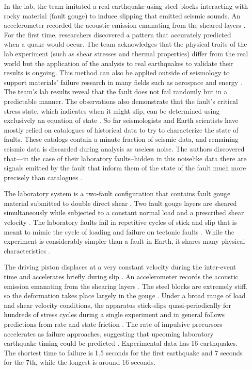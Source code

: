 \documentclass[]{llncs} %
\begin{document}
In the lab, the team imitated a real earthquake using steel blocks interacting with rocky material (fault gouge) to induce slipping that emitted seismic sounds. An accelerometer recorded the acoustic emission emanating from the sheared layers \cite{LANLNews}. For the first time, researchers discovered a pattern that accurately predicted when a quake would occur. The team acknowledges that the physical traits of the lab experiment (such as shear stresses and thermal properties) differ from the real world but the application of the analysis to real earthquakes to validate their results is ongoing. This method can also be applied outside of seismology to support materials’ failure research in many fields such as aerospace and energy \cite{LANLNews}. The team’s lab results reveal that the fault does not fail randomly but in a predictable manner. The observations also demonstrate that the fault’s critical stress state, which indicates when it might slip, can be determined using exclusively an equation of state \cite{LANLNews}. So far seismologists and Earth scientists have mostly relied on catalogues of historical data to try to characterize the state of faults. These catalogs contain a minute fraction of seismic data, and remaining seismic data is discarded during analysis as useless noise. The authors discovered that—in the case of their laboratory faults--hidden in this noiselike data there are signals emitted by the fault that inform them of the state of the fault much more precisely than catalogues \cite{LANLNews}. \par

The laboratory system is a two‐fault configuration that contains fault gouge material submitted to double direct shear \cite{kaggle}.
Two fault gouge layers are sheared simultaneously while subjected to a constant normal load and a prescribed shear velocity \cite{kaggle}. The laboratory faults fail in repetitive cycles of stick and slip that is meant to mimic the cycle of loading and failure on tectonic faults \cite{kaggle}. While the experiment is considerably simpler than a fault in Earth, it shares many physical characteristics \cite{kaggle}. \par

The driving piston displaces at a very constant velocity during the inter-event time and accelerates briefly during slip \cite{Bertrand}. An accelerometer records the acoustic emission emanating from the shearing layers \cite{Bertrand}. The steel blocks are extremely stiff, so the deformation takes place largely in the gouge \cite{Bertrand}. Under a broad range of load and shear velocity conditions, the apparatus stick‐slips quasi‐periodically for hundreds of stress cycles during a single experiment and in general follows predictions from rate and state friction \cite{Bertrand}. The rate of impulsive precursors accelerates as failure approaches, suggesting that upcoming laboratory earthquake timing could be predicted \cite{Bertrand}.
Experimental data has 16 earthquakes. The shortest time to failure is 1.5 seconds for the first earthquake and 7 seconds for the 7th, while the longest is around 16 seconds.
\end{document}
